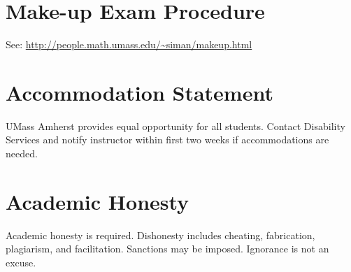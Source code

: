 \documentclass[11pt]{article}
\begin{document}
\section{Make-up Exam Procedure}
\label{sec:orgf72ff3a}
See: \url{http://people.math.umass.edu/\~siman/makeup.html}

\section{Accommodation Statement}
\label{sec:org43c52a0}
UMass Amherst provides equal opportunity for all students.  
Contact Disability Services and notify instructor within first two weeks if accommodations are needed.

\section{Academic Honesty}
\label{sec:org3b888d9}
Academic honesty is required.  
Dishonesty includes cheating, fabrication, plagiarism, and facilitation.  
Sanctions may be imposed.  
Ignorance is not an excuse.
\end{document}
